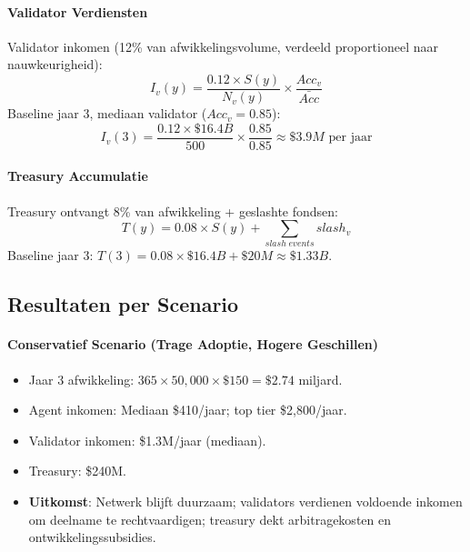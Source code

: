 \documentclass[11pt]{article}
\begin{document}
\paragraph{Validator Verdiensten} Validator inkomen (12\% van afwikkelingsvolume, verdeeld proportioneel naar nauwkeurigheid):
\begin{equation}
I_v(y) = \frac{0.12 \times S(y)}{N_v(y)} \times \frac{Acc_v}{\bar{Acc}}
\end{equation}
Baseline jaar 3, mediaan validator ($Acc_v = 0.85$):
\begin{equation}
I_v(3) = \frac{0.12 \times \$16.4B}{500} \times \frac{0.85}{0.85} \approx \$3.9M \text{ per jaar}
\end{equation}

\paragraph{Treasury Accumulatie} Treasury ontvangt 8\% van afwikkeling + geslashte fondsen:
\begin{equation}
T(y) = 0.08 \times S(y) + \sum_{slash \; events} slash_v
\end{equation}
Baseline jaar 3: $T(3) = 0.08 \times \$16.4B + \$20M \approx \$1.33B$.

\subsection{Resultaten per Scenario}
\paragraph{Conservatief Scenario (Trage Adoptie, Hogere Geschillen)}
\begin{itemize}[noitemsep]
  \item Jaar 3 afwikkeling: $365 \times 50{,}000 \times \$150 = \$2.74$ miljard.
  \item Agent inkomen: Mediaan \$410/jaar; top tier \$2{,}800/jaar.
  \item Validator inkomen: \$1.3M/jaar (mediaan).
  \item Treasury: \$240M.
  \item \textbf{Uitkomst}: Netwerk blijft duurzaam; validators verdienen voldoende inkomen om deelname te rechtvaardigen; treasury dekt arbitragekosten en ontwikkelingssubsidies.
\end{itemize}
\end{document}
